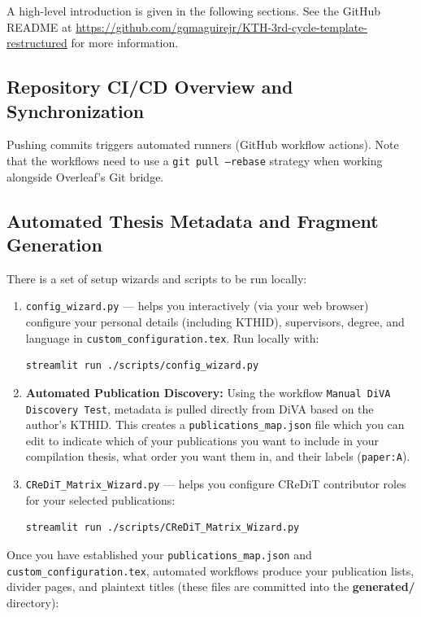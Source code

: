 \documentclass[12pt, twoside]{article}
\newcommand{\dname}[1]{\textbf{#1}}
\newcommand{\fname}[1]{\texttt{#1}}
\begin{document}
A high-level introduction is given in the following sections. See the GitHub README at \url{https://github.com/gqmaguirejr/KTH-3rd-cycle-template-restructured} for more information.

\subsection{Repository CI/CD Overview and Synchronization}
Pushing commits triggers automated runners (GitHub workflow actions). Note that the workflows need to use a \texttt{git pull --rebase} strategy when working alongside Overleaf's Git bridge.

\subsection{Automated Thesis Metadata and Fragment Generation}

There is a set of setup wizards and scripts to be run locally:
\begin{enumerate}
    \item \fname{config\_wizard.py} --- helps you interactively (via your web browser) configure your personal details (including KTHID), supervisors, degree, and language in \fname{custom\_configuration.tex}. Run locally with:
\begin{lstlisting}[language=bash]
streamlit run ./scripts/config_wizard.py
\end{lstlisting}

    \item \textbf{Automated Publication Discovery:} Using the workflow \fname{Manual DiVA Discovery Test}, metadata is pulled directly from DiVA based on the author's KTHID. This creates a \fname{publications\_map.json} file which you can edit to indicate which of your publications you want to include in your compilation thesis, what order you want them in, and their labels (\eg \texttt{paper:A}).
    
    \item \fname{CReDiT\_Matrix\_Wizard.py} --- helps you configure CReDiT contributor roles for your selected publications:
\begin{lstlisting}[language=bash]
streamlit run ./scripts/CReDiT_Matrix_Wizard.py
\end{lstlisting}
\end{enumerate}

Once you have established your \fname{publications\_map.json} and \linebreak[4]\fname{custom\_configuration.tex}, automated workflows produce your publication lists, divider pages, and plaintext titles (these files are committed into the \dname{generated/} directory):
\end{document}
